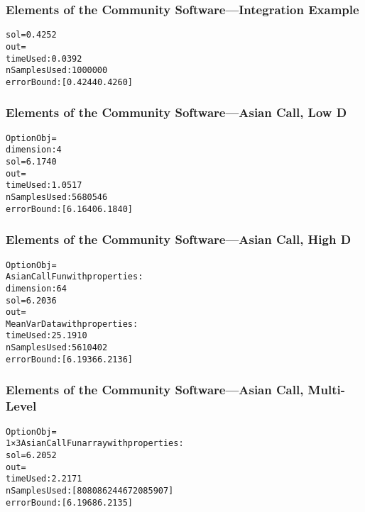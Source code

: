 \documentclass[11pt,compress,xcolor={usenames,dvipsnames},aspectratio=169]{beamer}
\newcommand{\ProgDir}{../../MATLAB_Prototype}
\begin{document}
\begin{frame}[fragile]
\frametitle{Elements of the Community Software---Integration Example}
\vspace{-5ex}


\begin{alltt}
sol = 0.4252
out = 
timeUsed: 0.0392
nSamplesUsed: 1000000
errorBound: [0.4244 0.4260]
\end{alltt}
\end{frame}


\begin{frame}[fragile]
\frametitle{Elements of the Community Software---Asian Call, Low D}
\vspace{-5ex}


\begin{alltt}
OptionObj = 
dimension: 4
sol = 6.1740
out = 
timeUsed: 1.0517
nSamplesUsed: 5680546
errorBound: [6.1640 6.1840]
\end{alltt}
\end{frame}


\begin{frame}[fragile]
\frametitle{Elements of the Community Software---Asian Call, High D}
\vspace{-5ex}


\begin{alltt}
OptionObj = 
AsianCallFun with properties:
dimension: 64
sol =6.2036
out = 
MeanVarData with properties:
timeUsed: 25.1910
nSamplesUsed: 5610402
errorBound: [6.1936 6.2136]
\end{alltt}
\end{frame}


\begin{frame}[fragile]
\frametitle{Elements of the Community Software---Asian Call, Multi-Level}
\vspace{-5ex}


\begin{alltt}
OptionObj = 
1×3 AsianCallFun array with properties:
sol = 6.2052
out = 
timeUsed: 2.2171
nSamplesUsed: [8080862 446720 85907]
errorBound: [6.1968 6.2135]
\end{alltt}
\end{frame}









\thankyouframe

\printbibliography
\end{document}
